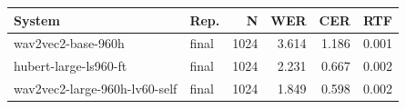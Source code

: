 \begin{tabular}{llrrrr}
\toprule
System & Rep. & N & WER & CER & RTF \\
\midrule
wav2vec2-base-960h & final & 1024 & 3.614 & 1.186 & 0.001 \\
hubert-large-ls960-ft & final & 1024 & 2.231 & 0.667 & 0.002 \\
wav2vec2-large-960h-lv60-self & final & 1024 & 1.849 & 0.598 & 0.002 \\
\bottomrule
\end{tabular}
